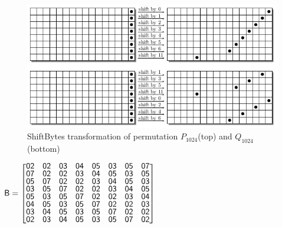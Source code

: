   \begin{figure}
    \begin{center}
      \includegraphics[width=6.4in]{groestl1024shift.jpg}
    \end{center}
    \caption{ShiftBytes transformation of permutation $P_{1024}$(top) and $Q_{1024}$(bottom) \cite{00019}}
    \label{fig:lab}
  \end{figure}

  \begin{center}
  $\mathsf{B} = \renewcommand\arraystretch{0.75}
  \begin{bmatrix}
  \mathsf{02} & \mathsf{02} & \mathsf{03} & \mathsf{04} & \mathsf{05} & \mathsf{03} & \mathsf{05} & \mathsf{07} \\
  \mathsf{07} & \mathsf{02} & \mathsf{02} & \mathsf{03} & \mathsf{04} & \mathsf{05} & \mathsf{03} & \mathsf{05} \\
  \mathsf{05} & \mathsf{07} & \mathsf{02} & \mathsf{02} & \mathsf{03} & \mathsf{04} & \mathsf{05} & \mathsf{03} \\
  \mathsf{03} & \mathsf{05} & \mathsf{07} & \mathsf{02} & \mathsf{02} & \mathsf{03} & \mathsf{04} & \mathsf{05} \\
  \mathsf{05} & \mathsf{03} & \mathsf{05} & \mathsf{07} & \mathsf{02} & \mathsf{02} & \mathsf{03} & \mathsf{04} \\
  \mathsf{04} & \mathsf{05} & \mathsf{03} & \mathsf{05} & \mathsf{07} & \mathsf{02} & \mathsf{02} & \mathsf{03} \\
  \mathsf{03} & \mathsf{04} & \mathsf{05} & \mathsf{03} & \mathsf{05} & \mathsf{07} & \mathsf{02} & \mathsf{02} \\
  \mathsf{02} & \mathsf{03} & \mathsf{04} & \mathsf{05} & \mathsf{03} & \mathsf{05} & \mathsf{07} & \mathsf{02} \\
  \end{bmatrix}$
  \end{center}
  

